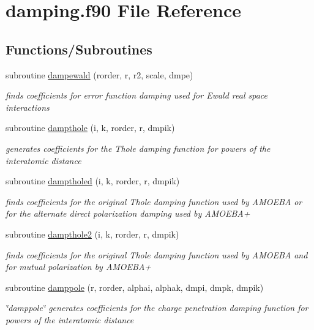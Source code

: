 \hypertarget{damping_8f90}{\section{damping.\-f90 File Reference}
\label{damping_8f90}
}
\subsection*{Functions/\-Subroutines}
\begin{DoxyCompactItemize}
\item 
subroutine \hyperlink{damping_8f90_aea60b3e1f71fedad546f4c95df6edecf}{dampewald} (rorder, r, r2, scale, dmpe)
\begin{DoxyCompactList}\small\item\em finds coefficients for error function damping used for Ewald real space interactions \end{DoxyCompactList}\item 
subroutine \hyperlink{damping_8f90_a601c8ce9a4d211fbf2339130e5a0a493}{dampthole} (i, k, rorder, r, dmpik)
\begin{DoxyCompactList}\small\item\em generates coefficients for the Thole damping function for powers of the interatomic distance \end{DoxyCompactList}\item 
subroutine \hyperlink{damping_8f90_ae5b94a64d584c9369019b393bed45ba2}{damptholed} (i, k, rorder, r, dmpik)
\begin{DoxyCompactList}\small\item\em finds coefficients for the original Thole damping function used by A\-M\-O\-E\-B\-A or for the alternate direct polarization damping used by A\-M\-O\-E\-B\-A+ \end{DoxyCompactList}\item 
subroutine \hyperlink{damping_8f90_a180f37f2d839d1ede80e511e7ad39bfb}{dampthole2} (i, k, rorder, r, dmpik)
\begin{DoxyCompactList}\small\item\em finds coefficients for the original Thole damping function used by A\-M\-O\-E\-B\-A and for mutual polarization by A\-M\-O\-E\-B\-A+ \end{DoxyCompactList}\item 
subroutine \hyperlink{damping_8f90_af74a23218fd1cedee53319289856d835}{damppole} (r, rorder, alphai, alphak, dmpi, dmpk, dmpik)
\begin{DoxyCompactList}\small\item\em \char`\"{}damppole\char`\"{} generates coefficients for the charge penetration damping function for powers of the interatomic distance \end{DoxyCompactList}\item 

\end{DoxyCompactItemize}
